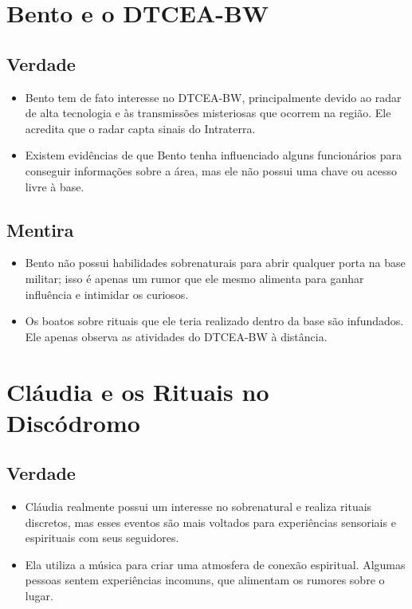 \section{Bento e o DTCEA-BW}

\subsection*{Verdade}
\begin{itemize}
    \item Bento tem de fato interesse no DTCEA-BW, principalmente devido ao radar de alta tecnologia e às transmissões misteriosas que ocorrem na região. Ele acredita que o radar capta sinais do Intraterra.
    \item Existem evidências de que Bento tenha influenciado alguns funcionários para conseguir informações sobre a área, mas ele não possui uma chave ou acesso livre à base.
\end{itemize}

\subsection*{Mentira}
\begin{itemize}
    \item Bento não possui habilidades sobrenaturais para abrir qualquer porta na base militar; isso é apenas um rumor que ele mesmo alimenta para ganhar influência e intimidar os curiosos.
    \item Os boatos sobre rituais que ele teria realizado dentro da base são infundados. Ele apenas observa as atividades do DTCEA-BW à distância.
\end{itemize}

\section{Cláudia e os Rituais no Discódromo}

\subsection*{Verdade}
\begin{itemize}
    \item Cláudia realmente possui um interesse no sobrenatural e realiza rituais discretos, mas esses eventos são mais voltados para experiências sensoriais e espirituais com seus seguidores.
    \item Ela utiliza a música para criar uma atmosfera de conexão espiritual. Algumas pessoas sentem experiências incomuns, que alimentam os rumores sobre o lugar.
\end{itemize}

